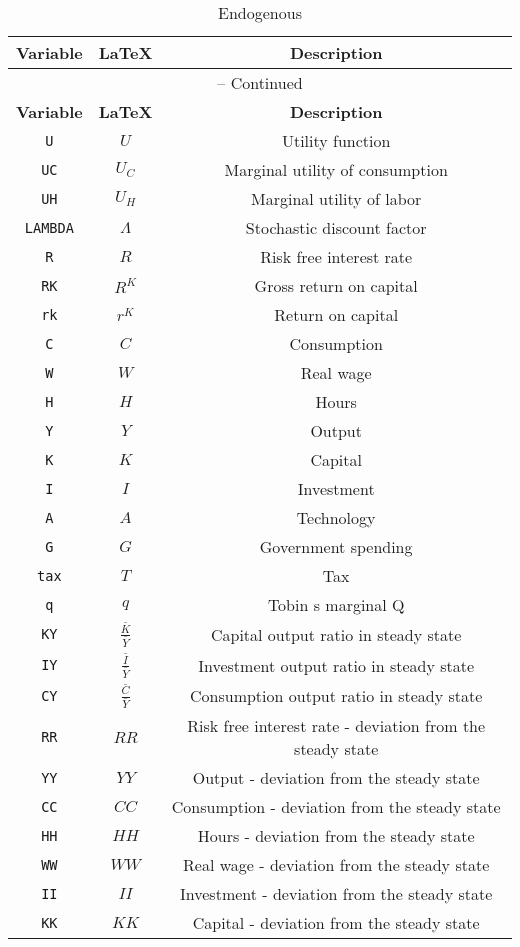 \begin{center}
\begin{longtable}{ccc}
\caption{Endogenous}\\%
\hline%
\multicolumn{1}{c}{\textbf{Variable}} &
\multicolumn{1}{c}{\textbf{\LaTeX}} &
\multicolumn{1}{c}{\textbf{Description}}\\%
\hline\hline%
\endfirsthead
\multicolumn{3}{c}{{\tablename} \thetable{} -- Continued}\\%
\hline%
\multicolumn{1}{c}{\textbf{Variable}} &
\multicolumn{1}{c}{\textbf{\LaTeX}} &
\multicolumn{1}{c}{\textbf{Description}}\\%
\hline\hline%
\endhead
\texttt{U} & $U$ & Utility function\\
\texttt{UC} & $U_C$ & Marginal utility of consumption\\
\texttt{UH} & $U_H$ & Marginal utility of labor\\
\texttt{LAMBDA} & $\Lambda$ & Stochastic discount factor\\
\texttt{R} & $R$ & Risk free interest rate\\
\texttt{RK} & $R^{K}$ & Gross return on capital\\
\texttt{rk} & $r^{K}$ & Return on capital\\
\texttt{C} & $C$ & Consumption\\
\texttt{W} & $W$ & Real wage\\
\texttt{H} & $H$ & Hours\\
\texttt{Y} & $Y$ & Output\\
\texttt{K} & $K$ & Capital\\
\texttt{I} & $I$ & Investment\\
\texttt{A} & $A$ & Technology\\
\texttt{G} & $G$ & Government spending\\
\texttt{tax} & $T$ & Tax\\
\texttt{q} & $q$ & Tobin s marginal Q \\
\texttt{KY} & $\frac{\bar{K}}{\bar{Y}}$ & Capital output ratio in steady state\\
\texttt{IY} & $\frac{\bar{I}}{\bar{Y}}$ & Investment output ratio in steady state\\
\texttt{CY} & $\frac{\bar{C}}{\bar{Y}}$ & Consumption output ratio in steady state\\
\texttt{RR} & $RR$ & Risk free interest rate - deviation from the steady state\\
\texttt{YY} & $YY$ & Output - deviation from the steady state\\
\texttt{CC} & $CC$ & Consumption - deviation from the steady state\\
\texttt{HH} & $HH$ & Hours - deviation from the steady state\\
\texttt{WW} & $WW$ & Real wage - deviation from the steady state\\
\texttt{II} & $II$ & Investment - deviation from the steady state\\
\texttt{KK} & $KK$ & Capital - deviation from the steady state\\
\hline%
\end{longtable}
\end{center}
